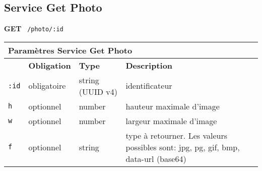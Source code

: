 \subsection{Service Get Photo}
\label{appendix:sprint3-photo-get-doc}

\textbf{GET} \ \texttt{/photo/:id}

\begin{table}[H]
    \centering
    \begin{tabularx}{\textwidth}{@{}p{2cm} p{2cm} p{3.5cm} p{6cm}@{}}
        \multicolumn{4}{X}{\textbf{Paramètres Service Get Photo}} \\
        \toprule
        \rowcolor{gray!20}
        \multicolumn{1}{l}{\textbf{Élément}} &
        \multicolumn{1}{l}{\textbf{Obligation}} &
        \multicolumn{1}{l}{\textbf{Type}} &
        \multicolumn{1}{l}{\textbf{Description}} \\
        \midrule
        \verb|:id| & obligatoire & string (UUID v4) & identificateur \\
        \verb|h| & optionnel & number & hauteur maximale d'image \\
        \verb|w| & optionnel & number & largeur maximale d'image \\
        \verb|f| & optionnel & string & type à retourner. Les valeurs possibles sont: jpg, pg, gif, bmp, data-url (base64) \\
        \bottomrule
    \end{tabularx}
\end{table}
